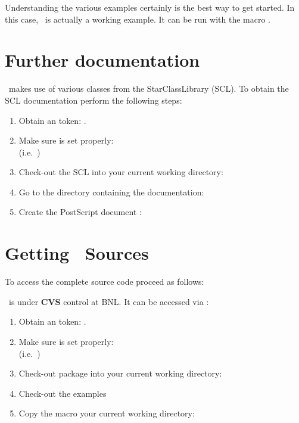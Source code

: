Understanding the various
examples certainly is the best way to get started. In this case,
\StMcAnalysisMaker\ is actually a working example.  It can be
run with the macro  .

\section{Further documentation}
\label{sec:furtherdoc}

\StAssociationMaker\ makes use of various classes from the StarClassLibrary (SCL).
To obtain the SCL documentation perform the following steps:
\begin{enumerate}
  \item Obtain an  token: .
  \item Make sure  is set properly: \\ %
	(i.e.~)
  \item Check-out the SCL into your current working directory:\\
  \item Go to the directory containing the documentation:\\
  \item Create the PostScript document :\\
\end{enumerate}
 


\section{Getting \StAssociationMaker\ Sources}  

To access the complete source code proceed as follows:

\StAssociationMaker\ is under {\bf CVS} control at BNL.  It can
be accessed via :   
\begin{enumerate}
  \item Obtain an  token: .
  \item Make sure  is set properly:\\ %
    (i.e.~)
  \item Check-out package into your current working directory:\\
  \item Check-out the examples
  \item Copy the macro your current working directory:
\end{enumerate}

